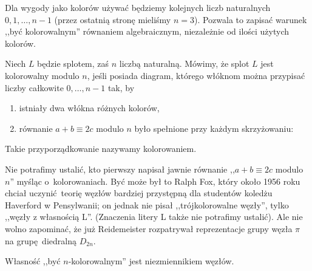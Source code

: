 Dla wygody jako kolorów używać będziemy kolejnych liczb naturalnych $0, 1, \ldots, n-1$
(przez ostatnią stronę mieliśmy $n = 3$).
Pozwala to zapisać warunek ,,być kolorowalnym'' równaniem algebraicznym, niezależnie od ilości użytych kolorów.

\begin{definition}[kolorowanie]
%
\label{def:colouring_equation}%
    Niech $L$ będzie splotem, zaś $n$ liczbą naturalną.
    Mówimy, że splot $L$ jest kolorowalny modulo $n$, jeśli posiada diagram, którego włóknom można przypisać liczby całkowite $0, \ldots, n - 1$ tak, by
    \begin{enumerate}
        \item istniały dwa włókna różnych kolorów,
        \item równanie $a + b \equiv 2c$ modulo $n$ było spełnione przy każdym skrzyżowaniu:
    \end{enumerate}

    Takie przyporządkowanie nazywamy kolorowaniem.
\end{definition}

Nie potrafimy ustalić, kto pierwszy napisał jawnie równanie ,,$a + b \equiv 2c$ modulo $n$'' myśląc o~kolorowaniach.
Być może był to Ralph Fox, który około 1956 roku chciał uczynić teorię węzłów bardziej przystępną dla studentów koledżu Haverford w Pensylwanii; on jednak nie pisał ,,trójkolorowalne węzły'', tylko ,,węzły z własnością L''.
(Znaczenia litery L także nie potrafimy ustalić).
Ale nie wolno zapominać, że już Reidemeister rozpatrywał reprezentacje grupy węzła $\pi$ na grupę diedralną $D_{2n}$.

\begin{proposition}
\label{prp:colouring_invariance}%
    Własność ,,być $n$-kolorowalnym'' jest niezmiennikiem węzłów.
\end{proposition}

